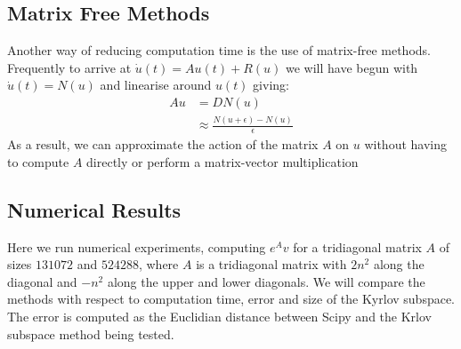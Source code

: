 \documentclass{article}
\begin{document}
\subsection{Matrix Free Methods}
Another way of reducing computation time is the use of matrix-free methods.
Frequently to arrive at $\dot u(t) = Au(t) + R(u)$ we will have begun with $\dot u(t) = N(u)$ and linearise around $u(t)$ giving:
\begin{align*}
Au &= DN(u)\\
&\approx \frac{N(u+\epsilon)-N(u)}{\epsilon}
\end{align*}
As a result, we can approximate the action of the matrix  $A$ on $u$ without having to compute $A$ directly or perform a matrix-vector multiplication

\subsection{Numerical Results}
Here we run numerical experiments, computing $e^Av$ for a tridiagonal matrix $A$ of sizes $131072$ and $524288$, where $A$ is a tridiagonal matrix with $2n^2$ along the diagonal and $-n^2$ along the upper and lower diagonals. We will compare the methods with respect to computation time, error and size of the Kyrlov subspace. The error is computed as the Euclidian distance between Scipy and the Krlov subspace method being tested.
\end{document}
